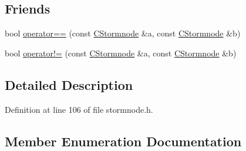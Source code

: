\subsection*{Friends}
\begin{DoxyCompactItemize}
\item 
bool \hyperlink{class_c_stormnode_a121484799f6f30f52d4c867ea52a6bca}{operator==} (const \hyperlink{class_c_stormnode}{C\+Stormnode} \&a, const \hyperlink{class_c_stormnode}{C\+Stormnode} \&b)
\item 
bool \hyperlink{class_c_stormnode_ab037406f267a8477e18d96d04b6080f1}{operator!=} (const \hyperlink{class_c_stormnode}{C\+Stormnode} \&a, const \hyperlink{class_c_stormnode}{C\+Stormnode} \&b)
\end{DoxyCompactItemize}


\subsection{Detailed Description}


Definition at line 106 of file stormnode.\+h.



\subsection{Member Enumeration Documentation}
\hypertarget{class_c_stormnode_a8c9a83b0ce70988102d71ecfabe99aa0}{}
